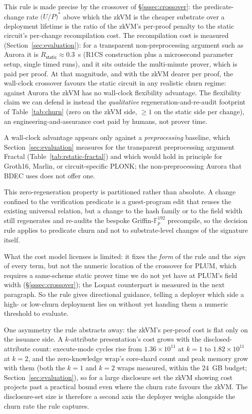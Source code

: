 \noindent This rule is made precise by the crossover of \S\ref{sssec:crossover}: the predicate-change rate $\bigl(U/P\bigr)^{*}$ above which the zkVM is the cheaper substrate over a deployment lifetime is the ratio of the zkVM's per-proof penalty to the static circuit's per-change recompilation cost. The recompilation cost is measured (Section~\ref{sec:evaluation}): for a transparent non-preprocessing argument such as Aurora it is $R_{\mathsf{static}}\approx 0.3$~s (R1CS construction plus a microsecond parameter setup, single timed runs), and it sits outside the multi-minute prover, which is paid per proof. At that magnitude, and with the zkVM dearer per proof, the wall-clock crossover favours the static circuit in any realistic churn regime: against Aurora the zkVM has no wall-clock flexibility advantage. The flexibility claim we can defend is instead the \emph{qualitative} regeneration-and-re-audit footprint of Table~\ref{tab:churn} (zero on the zkVM side, $\geq 1$ on the static side per change), an engineering-and-assurance cost paid by humans, not prover time.

\noindent A wall-clock advantage appears only against a \emph{preprocessing} baseline, which Section~\ref{sec:evaluation} measures for the transparent preprocessing argument Fractal (Table~\ref{tab:rstatic-fractal}) and which would hold in principle for Groth16, Marlin, or circuit-specific PLONK; the non-preprocessing Aurora that BDEC uses does not offer one.

\noindent This zero-regeneration property is partitioned rather than absolute. A change confined to the verification predicate is a guest-program edit that reuses the existing universal relation, but a change to the hash family or to the field width still regenerates and re-audits the bespoke Griffin-$\mathbb{F}_p^{192}$ precompile, so the decision rule applies to predicate churn and not to substrate-level changes of the signature itself.

\noindent What the cost model licenses is limited: it fixes the \emph{form} of the rule and the \emph{sign} of every term, but not the numeric location of the crossover for PLUM, which requires a same-scheme static prover time we do not yet have at PLUM's field width (\S\ref{sssec:crossover}); the Loquat counterpart is measured in the next paragraph. So the rule gives directional guidance, telling a deployer which side a high- or low-churn deployment lies on without yet handing them a numeric threshold to evaluate.

\noindent One asymmetry the rule abstracts away: the zkVM's per-proof cost is flat only on the issuance side. A $k$-attribute presentation's cost grows with the disclosed-attribute count: execute-mode cycles rise from $1.36\times10^{11}$ at $k=1$ to $1.82\times10^{11}$ at $k=2$, and the zero-knowledge wrap's core-shard count and peak memory grow with them (both the $k=1$ and $k=2$ wraps measured, within the $24$~GB budget; Section~\ref{sec:evaluation}), so for a large disclosure set the zkVM showing cost projects past a practical bound even where the churn rate favours the zkVM. The disclosure-set size is therefore a second axis the deployer weighs alongside the churn rate the rule captures.

